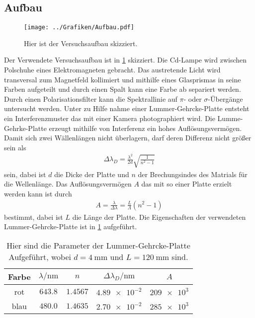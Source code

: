 \subsection{Aufbau}
\begin{figure}[h!]
		\centering
		\texttt{[image: ../Grafiken/Aufbau.pdf]}
		\caption{Hier ist der Versuchsaufbau skizziert. \cite{V27}\label{fig:Versuchsaufbau}}
\end{figure}
\noindent
Der Verwendete Versuchsaufbau ist in \cref{fig:Versuchsaufbau} skizziert.
Die Cd-Lampe wird zwischen Polschuhe eines Elektromagneten gebracht.
Das austretende Licht wird transversal zum Magnetfeld kollimiert und mithilfe eines Glasprismas in seine Farben aufgeteilt und durch einen Spalt kann eine Farbe ab separiert werden.
Durch einen Polarisationsfilter kann die Spektrallinie auf $\pi$- oder $\sigma$-Übergänge untersucht werden.
Unter zu Hilfe nahme einer Lummer-Gehrcke-Platte entsteht ein Interferenzmuster das mit einer Kamera photographiert wird.
Die Lumme-Gehrke-Platte erzeugt mithilfe von Interferenz ein hohes Auflösungsvermögen.
Damit sich zwei Wällenlängen nicht überlagern, darf deren Differenz nicht größer sein als
\begin{align}
	\Delta \lambda_D =\frac{\lambda^2}{2d}\sqrt{\frac{1}{n^2-1}}
\end{align}
sein, dabei ist $d$ die Dicke der Platte und $n$ der Brechungsindes des Matrials für die Wellenlänge.
Das Auflösungsvermögen $A$ das mit so einer Platte erzielt werden kann ist durch
\begin{align}
	A=\frac{\lambda}{\Delta\lambda}=\frac{L}{\Lambda}(n^2-1)
\end{align}
bestimmt, dabei ist $L$ die Länge der Platte.
Die Eigenschaften der verwendeten Lummer-Gehrcke-Platte ist in \cref{tab:Lummer-Gehrcke} aufgeführt.
\begin{table}[h!]
	\centering
	\begin{tabular}{ccccc}
		\toprule
		Farbe & $\lambda/\si{\nano\meter}$& $n$ & $\Delta\lambda_D/\si{\nano\meter}$& $A$\\\midrule
		rot & $\num{643,8}$ & $\num{1,4567}$ & $\num{4.89e-2}$ & $\num{209e3}$\\
		blau & $\num{480,0}$& $\num{1,4635}$ & $\num{2,70e-2}$ & $\num{285e3}$\\\bottomrule
	\end{tabular}
	\caption{Hier sind die Parameter der Lummer-Gehrcke-Platte Aufgeführt, wobei $d=\SI{4}{\milli\meter}$ und $L=\SI{120}{\milli\meter}$ sind. \label{tab:Lummer-Gehrcke}}
\end{table}

